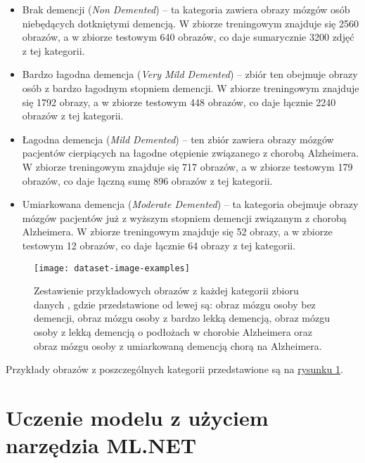 \begin{itemize}

  \item
        Brak demencji (\emph{Non Demented}) -- ta kategoria zawiera obrazy mózgów osób niebędących dotkniętymi demencją.
        W zbiorze treningowym znajduje się 2560 obrazów, a w zbiorze testowym 640 obrazów, co daje sumarycznie 3200 zdjęć z tej kategorii.

  \item
        Bardzo łagodna demencja (\emph{Very Mild Demented}) -- zbiór ten obejmuje obrazy osób z bardzo łagodnym stopniem demencji.
        W zbiorze treningowym znajduje się 1792 obrazy, a w zbiorze testowym 448 obrazów, co daje łącznie 2240 obrazów z tej kategorii.

  \item
        Łagodna demencja (\emph{Mild Demented}) -- ten zbiór zawiera obrazy mózgów pacjentów cierpiących na łagodne otępienie związanego z chorobą Alzheimera.
        W zbiorze treningowym znajduje się 717 obrazów, a w zbiorze testowym 179 obrazów, co daje łączną sumę 896 obrazów z tej kategorii.

  \item
        Umiarkowana demencja (\emph{Moderate Demented}) -- ta kategoria obejmuje obrazy mózgów pacjentów już z wyższym stopniem demencji związanym z chorobą Alzheimera.
        W zbiorze treningowym znajduje się 52 obrazy, a w zbiorze testowym 12 obrazów, co daje łącznie 64 obrazy z tej kategorii.

\end{itemize}

\begin{figure}[ht]
  \texttt{[image: dataset-image-examples]}
  \caption[Zestawienie przykładowych obrazów z każdej kategorii zbioru danych]{Zestawienie przykładowych obrazów z każdej kategorii zbioru danych \cite{kaggle-alzheimers-dataset}, gdzie przedstawione od lewej są: obraz mózgu osoby bez demencji, obraz mózgu osoby z bardzo lekką demencją, obraz mózgu osoby z lekką demencją o podłożach w chorobie Alzheimera oraz obraz mózgu osoby z umiarkowaną demencją chorą na Alzheimera.}
  \label{fig:dataset-image-examples}
\end{figure}

Przykłady obrazów z poszczególnych kategorii przedstawione są na \hyperref[fig:dataset-image-examples]{rysunku \ref*{fig:dataset-image-examples}}.

\section{Uczenie modelu z użyciem narzędzia ML.NET}



